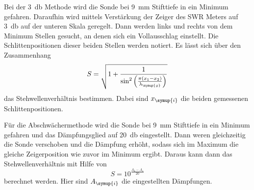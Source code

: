 Bei der \SI{3}{\decibel} Methode wird die Sonde bei \SI{9}{\milli\meter} Stifttiefe in ein
Minimum gefahren. Daraufhin wird mittels Verstärkung der Zeiger des SWR Meters auf
\SI{3}{\decibel} auf der unteren Skala geregelt. Dann werden links und rechts von dem Minimum
Stellen gesucht, an denen sich ein Vollausschlag einstellt. Die Schlittenpositionen
dieser beiden Stellen werden notiert. Es lässt sich über den Zusammenhang
\begin{equation}
  S=\sqrt{1+\frac{1}{\sin^2\left(\frac{\pi(x_1-x_2)}{\lambda_{\symup{g}}}\right)}}
  \label{eqn:3dB}
\end{equation}
das Stehwellenverhältnis bestimmen. Dabei sind $x_{\symup{i}}$ die beiden gemessenen
Schlittenpositionen.

Für die Abschwächermethode wird die Sonde bei \SI{9}{\milli\meter} Stifttiefe in ein
Minimum gefahren und das Dämpfungsglied auf \SI{20}{\decibel} eingestellt. Dann
weren gleichzeitig die Sonde verschoben und die Dämpfung erhöht, sodass sich im
Maximum die gleiche Zeigerposition wie zuvor im Minimum ergibt. Daraus kann dann
das Stehwellenverhältnis mit Hilfe von
\begin{equation}
  S=10^{\frac{A_2-A_1}{20}}
  \label{eqn:abschwaecher}
\end{equation}
berechnet werden. Hier sind $A_{\symup{i}}$ die eingestellten Dämpfungen.
